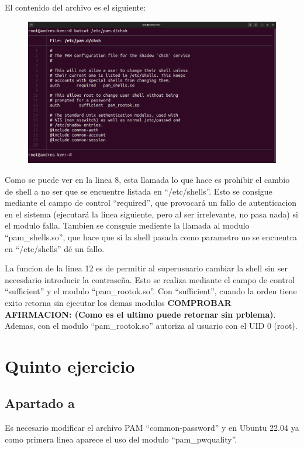 \documentclass{article}
\begin{document}
El contenido del archivo es el siguiente:

\begin{figure}[H]
    \includegraphics[width=\textwidth]{imagenes/pamchsh.png}
\end{figure}


Como se puede ver en la linea 8, esta llamada lo que hace es prohibir el cambio de shell a no ser que se encuentre listada en ``/etc/shells''. Esto se consigue mediante el campo de control ``required'', que provocará un fallo de autenticacion en el sistema (ejecutará la linea siguiente, pero al ser irrelevante, no pasa nada) si el modulo falla. Tambien se consguie mediente la llamada al modulo ``pam\_shells.so'', que hace que si la shell pasada como parametro no se encuentra en ``/etc/shells'' dé un fallo.

La funcion de la linea 12 es de permitir al superusuario cambiar la shell sin ser necesdario introducir la contraseña. Esto se realiza mediante el campo de control ``sufficient'' y el modulo ``pam\_rootok.so''. Con ``sufficient'', cuando la orden tiene exito retorna sin ejecutar los demas modulos \textbf{COMPROBAR AFIRMACION: (Como es el ultimo puede retornar sin prblema)}. Ademas, con el modulo ``pam\_rootok.so'' autoriza al usuario con el UID 0 (root).


\section{Quinto ejercicio}
\subsection{Apartado a}
Es necesario modificar el archivo PAM ``common-password'' y en Ubuntu 22.04 ya como primera linea aparece el uso del modulo ``pam\_pwquality''. 
\end{document}
